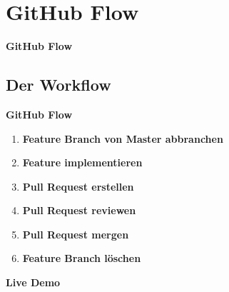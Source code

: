 \section{GitHub Flow}\label{sec:github-flow}
\begin{frame}[c]
    \centering
    \Large
    \textbf{GitHub Flow}
\end{frame}

\subsection{Der Workflow}\label{subsec:der-workflow}
\begin{frame}[c]
    \slidehead
    \centering
    \large
    \textbf{GitHub Flow}
    \vspace{1em}
    \begin{enumerate}[<+->]
        \item \textbf{Feature Branch von Master abbranchen}
        \item \textbf{Feature implementieren}
        \item \textbf{Pull Request erstellen}
        \item \textbf{Pull Request reviewen}
        \item \textbf{Pull Request mergen}
        \item \textbf{Feature Branch löschen}
    \end{enumerate}
\end{frame}

\begin{frame}[c]
    \centering
    \Large
    \textbf{Live Demo}
\end{frame}

